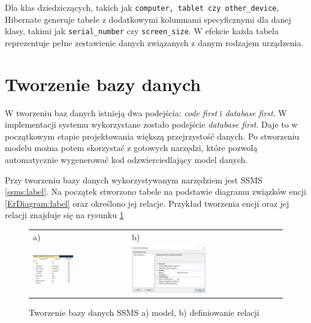 Dla klas dziedziczących, takich jak \texttt{computer, tablet czy other\_device}, Hibernate generuje tabele z dodatkowymi kolumnami specyficznymi dla danej klasy, takimi jak \texttt{serial\_number} czy \texttt{screen\_size}. W efekcie każda tabela reprezentuje pełne zestawienie danych związanych z danym rodzajem urządzenia.



\section{Tworzenie bazy danych}
W tworzeniu baz danych istnieją dwa podejścia: \emph{code first} i \emph{database first}. W implementacji systemu wykorzystane zostało podejście \emph{database first}. Daje to w początkowym etapie projektowania większą przejrzystość danych. Po stworzeniu modelu można potem skorzystać z gotowych narzędzi, które pozwolą automatycznie wygenerować kod odzwierciedlający model danych.

Przy tworzeniu bazy danych wykorzystywanym narzędziem jest SSMS \ref{ssms:label}. Na początek stworzono tabele na podstawie diagramu związków encji \ref{ErDiagram:label} oraz określono jej relacje. Przykład tworzenia encji oraz jej relacji znajduje się na rysunku \ref{ssms_tworzenie:label}

\begin{figure}[htb]
  \centering
	\begin{tabular}{@{}ll@{}}
	a) & b) \\
  \includegraphics[width=0.445\textwidth]{rys04/design.pdf} & 
	\includegraphics[width=0.505\textwidth]{rys04/relation.pdf}
	\end{tabular}
  \caption{Tworzenie bazy danych SSMS a) model, b) definiowanie relacji}
  \label{ssms_tworzenie:label}
\end{figure}

